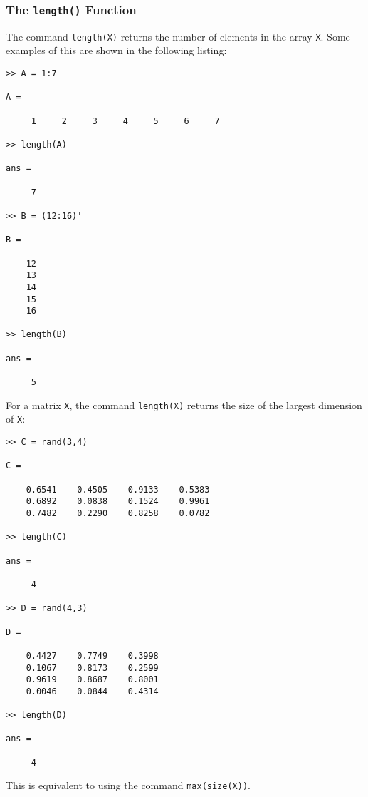 \subsubsection{The \texttt{length()} Function}
The command \texttt{length(X)} returns the number of elements in the array \texttt{X}. Some examples of this are shown in the following listing:
\begin{lstlisting}[style=Matlab-editor]
>> A = 1:7

A =

     1     2     3     4     5     6     7

>> length(A)

ans =

     7

>> B = (12:16)'

B =

    12
    13
    14
    15
    16

>> length(B)

ans =

     5
\end{lstlisting}
For a matrix \texttt{X}, the command \texttt{length(X)} returns the size of the largest dimension of \texttt{X}:
\begin{lstlisting}[style=Matlab-editor]
>> C = rand(3,4)

C =

    0.6541    0.4505    0.9133    0.5383
    0.6892    0.0838    0.1524    0.9961
    0.7482    0.2290    0.8258    0.0782

>> length(C)

ans =

     4

>> D = rand(4,3)

D =

    0.4427    0.7749    0.3998
    0.1067    0.8173    0.2599
    0.9619    0.8687    0.8001
    0.0046    0.0844    0.4314

>> length(D)

ans =

     4
\end{lstlisting}
This is equivalent to using the command \texttt{max(size(X))}.


